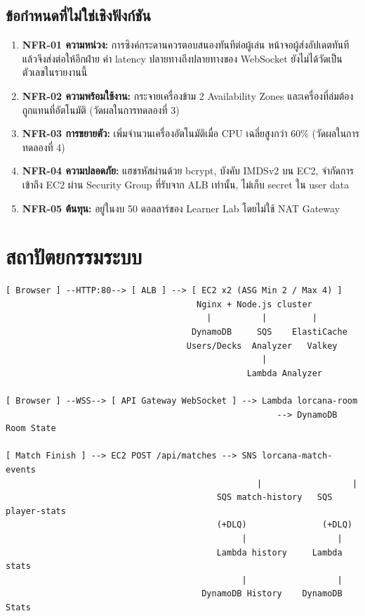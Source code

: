 \subsection{ข้อกำหนดที่ไม่ใช่เชิงฟังก์ชัน}
\begin{enumerate}
    \item \textbf{NFR-01 ความหน่วง:} การซิงค์กระดานควรตอบสนองทันทีต่อผู้เล่น หน้าจอผู้ส่งอัปเดตทันทีแล้วจึงส่งต่อให้อีกฝ่าย ค่า latency ปลายทางถึงปลายทางของ WebSocket ยังไม่ได้วัดเป็นตัวเลขในรายงานนี้ 
    \item \textbf{NFR-02 ความพร้อมใช้งาน:} กระจายเครื่องข้าม 2 Availability Zones และเครื่องที่ล่มต้องถูกแทนที่อัตโนมัติ (วัดผลในการทดลองที่ 3)
    \item \textbf{NFR-03 การขยายตัว:} เพิ่มจำนวนเครื่องอัตโนมัติเมื่อ CPU เฉลี่ยสูงกว่า 60\% (วัดผลในการทดลองที่ 4)
    \item \textbf{NFR-04 ความปลอดภัย:} แฮชรหัสผ่านด้วย bcrypt, บังคับ IMDSv2 บน EC2, จำกัดการเข้าถึง EC2 ผ่าน Security Group ที่รับจาก ALB เท่านั้น, ไม่เก็บ secret ใน user data
    \item \textbf{NFR-05 ต้นทุน:} อยู่ในงบ 50 ดอลลาร์ของ Learner Lab โดยไม่ใช้ NAT Gateway
\end{enumerate}

\section{สถาปัตยกรรมระบบ}

\begin{lstlisting}[caption={สถาปัตยกรรมระบบ Disney Lorcana PlayLab Cloud}]
[ Browser ] --HTTP:80--> [ ALB ] --> [ EC2 x2 (ASG Min 2 / Max 4) ]
                                      Nginx + Node.js cluster
                                        |          |         |
                                     DynamoDB     SQS    ElastiCache
                                    Users/Decks  Analyzer   Valkey
                                                   |
                                                Lambda Analyzer

[ Browser ] --WSS--> [ API Gateway WebSocket ] --> Lambda lorcana-room
                                                      --> DynamoDB Room State

[ Match Finish ] --> EC2 POST /api/matches --> SNS lorcana-match-events
                                                  |                  |
                                          SQS match-history   SQS player-stats
                                          (+DLQ)               (+DLQ)
                                               |                  |
                                          Lambda history     Lambda stats
                                               |                  |
                                       DynamoDB History    DynamoDB Stats
\end{lstlisting}

